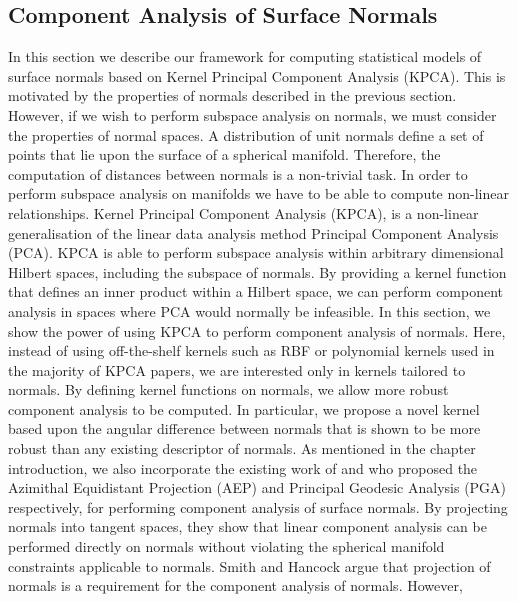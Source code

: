 \subsection{Component Analysis of Surface Normals}\label{subsec:singl_img_ca}
In this section we describe our framework for computing statistical models of
surface normals based on Kernel Principal Component Analysis (KPCA). This is
motivated by the properties of normals described in the previous section.
However, if we wish to perform subspace analysis on normals, we must consider
the properties of normal spaces. A distribution of unit normals define a set of
points that lie upon the surface of a spherical manifold. Therefore, the
computation of distances between normals is a non-trivial task. In order to
perform subspace analysis on manifolds we have to be able to compute non-linear
relationships. Kernel Principal Component Analysis (KPCA), is a non-linear
generalisation of the linear data analysis method Principal Component Analysis
(PCA). KPCA is able to perform subspace analysis within arbitrary dimensional
Hilbert spaces, including the subspace of normals. By providing a kernel
function that defines an inner product within a Hilbert space, we can perform
component analysis in spaces where PCA would normally be infeasible. In this
section, we show the power of using KPCA to perform component analysis of
normals. Here, instead of using off-the-shelf kernels such as RBF or polynomial
kernels used in the majority of KPCA papers, we are interested only in kernels
tailored to normals. By defining kernel functions on normals, we allow more
robust component analysis to be computed. In particular, we propose a novel
kernel based upon the angular difference between normals that is shown to be
more robust than any existing descriptor of normals. 
As mentioned in the chapter introduction, we also incorporate the existing work of
\citet{smith2006recovering} and \citet{smith2008facial} who proposed the
Azimithal Equidistant Projection (AEP) and Principal Geodesic Analysis (PGA)
respectively, for performing component analysis of surface normals. By
projecting normals into tangent spaces, they show that linear component analysis
can be performed directly on normals without violating the spherical manifold
constraints applicable to normals. Smith and Hancock argue that projection of
normals is a requirement for the component analysis of normals. However,
